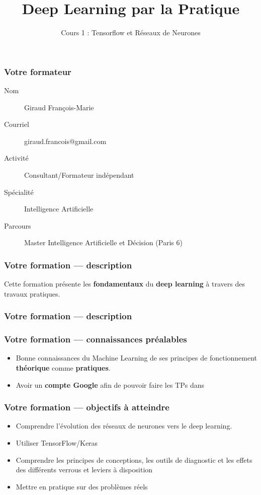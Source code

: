\documentclass{formation}
\title{Deep Learning par la Pratique}
\subtitle{Cours 1 : Tensorflow et Réseaux de Neurones}
\begin{document}
\maketitle

\begin{frame}
  \frametitle{Votre formateur}
  \begin{description}
  \item[Nom] Giraud François-Marie
  \item[Courriel] giraud.francois@gmail.com
  \item[Activité] Consultant/Formateur indépendant
  \item[Spécialité] Intelligence Artificielle
  \item[Parcours] Master Intelligence Artificielle et Décision (Paris 6)
  \end{description}
\end{frame}

\begin{frame}
  \frametitle{Votre formation — description}
  Cette formation présente les \textbf{fondamentaux} du \textbf{deep learning} à travers des travaux pratiques. \\
\end{frame}

\begin{frame}
  \frametitle{Votre formation — description}
\end{frame}

\begin{frame}
  \frametitle{Votre formation — connaissances préalables}
  \begin{itemize}
  \item Bonne connaissances du Machine Learning de ses principes de fonctionnement \textbf{théorique} comme \textbf{pratiques}. 
  \item Avoir un \textbf{compte Google} afin de pouvoir faire les TPs dans 
  \end{itemize}
\end{frame}

\begin{frame}
  \frametitle{Votre formation — objectifs à atteindre}
  \begin{itemize}
  \item Comprendre l'évolution des réseaux de neurones vers le deep learning.
  \item Utiliser TensorFlow/Keras
  \item Comprendre les principes de conceptions, les outils de diagnostic et les effets des différents verrous et leviers à disposition
  \item Mettre en pratique sur des problèmes réels
  \end{itemize}
\end{frame}
\end{document}

